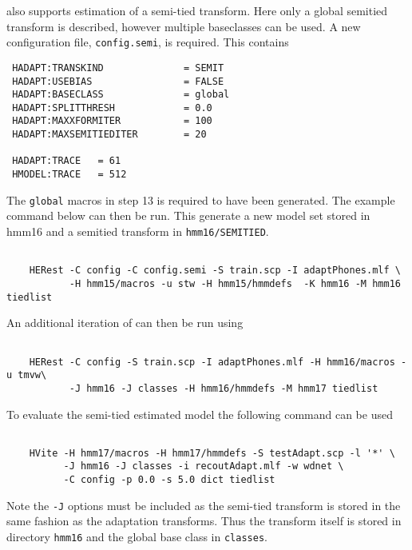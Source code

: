  also supports estimation of a semi-tied transform. Here only a global
semitied transform is described, however multiple baseclasses can be used. A new
configuration file, \texttt{config.semi}, is required. This contains
\begin{verbatim}
 HADAPT:TRANSKIND              = SEMIT
 HADAPT:USEBIAS                = FALSE
 HADAPT:BASECLASS              = global
 HADAPT:SPLITTHRESH            = 0.0
 HADAPT:MAXXFORMITER           = 100
 HADAPT:MAXSEMITIEDITER        = 20

 HADAPT:TRACE   = 61
 HMODEL:TRACE   = 512
\end{verbatim}
The \texttt{global} macros in step 13 is required to have been generated. The example
command below can then be run. This generate a new model set stored in hmm16 and 
a semitied transform in \texttt{hmm16/SEMITIED}.
\begin{verbatim}

    HERest -C config -C config.semi -S train.scp -I adaptPhones.mlf \
           -H hmm15/macros -u stw -H hmm15/hmmdefs  -K hmm16 -M hmm16 tiedlist

\end{verbatim}
An additional iteration of  can then be run using
\begin{verbatim}

    HERest -C config -S train.scp -I adaptPhones.mlf -H hmm16/macros -u tmvw\
           -J hmm16 -J classes -H hmm16/hmmdefs -M hmm17 tiedlist

\end{verbatim}
To evaluate the semi-tied estimated model the following command can be used
\begin{verbatim}

    HVite -H hmm17/macros -H hmm17/hmmdefs -S testAdapt.scp -l '*' \ 
          -J hmm16 -J classes -i recoutAdapt.mlf -w wdnet \ 
          -C config -p 0.0 -s 5.0 dict tiedlist

\end{verbatim}
Note the {\tt -J} options must be included as the semi-tied transform is
stored in the same fashion as the adaptation transforms. Thus the transform
itself is stored in directory {\tt hmm16} and the global base class in {\tt classes}.

